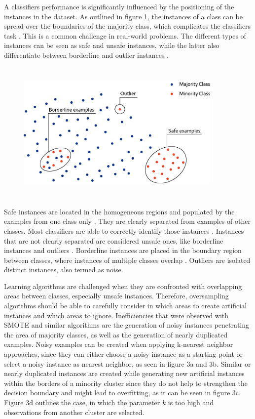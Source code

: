 \documentclass[parskip=full]{scrartcl}
\begin{document}
A classifiers performance is significantly influenced by the positioning of the instances in the dataset. As outlined in figure \ref{fig:Sez}, the instances of a class can be spread over the boundaries of the majority class, which complicates the classifiers task \cite{Tang2007}. This is a common challenge in real-world problems. The different types of instances can be seen as safe and unsafe instances, while the latter also differentiate between borderline and outlier instances \cite{Sez2016}.

\begin{figure}[H]
	\centering
	\includegraphics[width=10cm,height=7cm, keepaspectratio]{../analysis/fig2.png}
	\label{fig:Sez}
\end{figure}

Safe instances are located in the homogeneous regions and populated by the
examples from one class only \cite{rodriguez2012}. They are clearly separated from examples of other classes. Most classifiers are able to correctly identify those instances \cite{Prati2004B}. Instances that are not clearly separated are considered unsafe ones, like borderline instances and outliers \cite{Kubat1997}. Borderline instances are placed in the boundary region between classes, where instances of multiple classes overlap \cite{Sez2016}. Outliers are isolated distinct instances, also termed as noise.

Learning algorithms are challenged when they are confronted with overlapping areas between classes, especially unsafe instances. Therefore, oversampling algorithms should be able to carefully consider in which areas to create artificial instances and which areas to ignore. Inefficiencies that were observed with SMOTE and similar algorithms are the generation of noisy instances penetrating the area of majority classes, as well as the generation of nearly duplicated examples. Noisy examples can be created when applying k-nearest neighbor approaches, since they can either choose a noisy instance as a starting point or select a noisy instance as nearest neighbor, as seen in figure 3a and 3b. Similar or nearly duplicated instances are created while generating new artificial instances within the borders of a minority cluster since they do not help to strengthen the decision boundary and might lead to overfitting, as it can be seen in figure 3c. Figure 3d outlines the case, in which the parameter $k$ is too high and observations from another cluster are selected.
\end{document}
